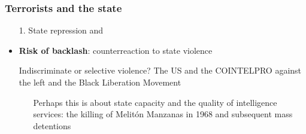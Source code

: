 \documentclass[aspectratio=43]{beamer}
\begin{document}
\begin{frame}
\frametitle{Terrorists and the state}
\centering

\begin{itemize}
  \item[1.] State repression and {\color{red}{counter-terrorist violence}}
  \item<2-> \textbf{Risk of backlash}: counterreaction to state violence
  \item[\textcolor{white}{\textbullet}] {\color{white} Indiscriminate or selective violence? The US and the COINTELPRO against the left and the Black Liberation Movement}
  \begin{itemize}\color{white}
    \item[\textcolor{white}{\textbullet}] Perhaps this is about state capacity and the quality of intelligence services: the killing of Melitón Manzanas in 1968 and subsequent mass detentions
  \end{itemize}
\end{itemize}

\end{frame}
\end{document}
